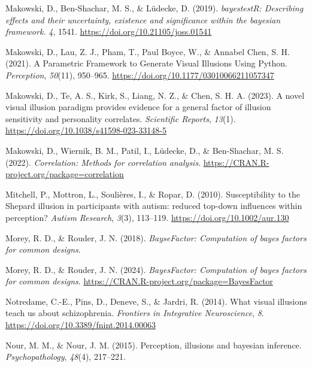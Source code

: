 \documentclass[
  man,
  floatsintext,
  longtable,
  nolmodern,
  notxfonts,
  notimes,
  colorlinks=true,linkcolor=blue,citecolor=blue,urlcolor=blue]{apa7}
\newlength{\cslhangindent}
\newenvironment{CSLReferences}[2] %
 {\begin{list}{}{%
  \setlength{\itemindent}{0pt}
  \setlength{\leftmargin}{0pt}
  \setlength{\parsep}{0pt}
  \ifodd #1
   \setlength{\leftmargin}{\cslhangindent}
   \setlength{\itemindent}{-1\cslhangindent}
  \fi
  \setlength{\itemsep}{#2\baselineskip}}}
 {\end{list}}
\begin{document}
\begin{CSLReferences}{1}{0}
Makowski, D., Ben-Shachar, M. S., \& Lüdecke, D. (2019).
\emph{bayestestR: Describing effects and their uncertainty, existence
and significance within the bayesian framework.} \emph{4}, 1541.
\url{https://doi.org/10.21105/joss.01541}

Makowski, D., Lau, Z. J., Pham, T., Paul Boyce, W., \& Annabel Chen, S.
H. (2021). A Parametric Framework to Generate Visual Illusions Using
Python. \emph{Perception}, \emph{50}(11), 950--965.
\url{https://doi.org/10.1177/03010066211057347}

Makowski, D., Te, A. S., Kirk, S., Liang, N. Z., \& Chen, S. H. A.
(2023). A novel visual illusion paradigm provides evidence for a general
factor of illusion sensitivity and personality correlates.
\emph{Scientific Reports}, \emph{13}(1).
\url{https://doi.org/10.1038/s41598-023-33148-5}

Makowski, D., Wiernik, B. M., Patil, I., Lüdecke, D., \& Ben-Shachar, M.
S. (2022).
\emph{{\textbraceleft}{\textbraceleft}Correlation{\textbraceright}{\textbraceright}:
Methods for correlation analysis}.
\url{https://CRAN.R-project.org/package=correlation}

Mitchell, P., Mottron, L., Soulières, I., \& Ropar, D. (2010).
Susceptibility to the Shepard illusion in participants with autism:
reduced top{-}down influences within perception? \emph{Autism Research},
\emph{3}(3), 113--119. \url{https://doi.org/10.1002/aur.130}

Morey, R. D., \& Rouder, J. N. (2018). \emph{BayseFactor: Computation of
bayes factors for common designs}.

Morey, R. D., \& Rouder, J. N. (2024). \emph{BayesFactor: Computation of
bayes factors for common designs}.
\url{https://CRAN.R-project.org/package=BayesFactor}

Notredame, C.-E., Pins, D., Deneve, S., \& Jardri, R. (2014). What
visual illusions teach us about schizophrenia. \emph{Frontiers in
Integrative Neuroscience}, \emph{8}.
\url{https://doi.org/10.3389/fnint.2014.00063}

Nour, M. M., \& Nour, J. M. (2015). Perception, illusions and bayesian
inference. \emph{Psychopathology}, \emph{48}(4), 217--221.


\end{CSLReferences}
\end{document}
